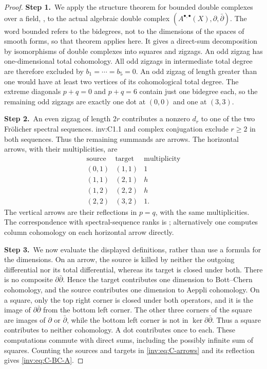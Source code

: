 \begin{proof}
\par\smallskip\noindent\textbf{Step 1.}\ We apply the structure theorem for bounded double complexes over a
field, \cite[Theorem 3]{Stelzig21}, to the actual algebraic double
complex $(A^{\bullet,\bullet}(X),\partial,\bar\partial)$.
The word bounded refers to the bidegrees, not to the dimensions of the
spaces of smooth forms, so that theorem applies here.  It gives a
direct-sum decomposition by isomorphisms of double complexes into
squares and zigzags.  An odd zigzag has one-dimensional total
cohomology.  All odd zigzags in intermediate total degree are therefore
excluded by $b_1=\cdots=b_5=0$.  An odd zigzag of length greater than
one would have at least two vertices of its cohomological total degree.
The extreme diagonals $p+q=0$ and $p+q=6$ contain just one bidegree
each, so the remaining odd zigzags are exactly one dot at $(0,0)$ and
one at $(3,3)$.

\par\smallskip\noindent\textbf{Step 2.}\ An even zigzag of length $2r$ contributes a nonzero $d_r$ to one of
the two Fr\"olicher spectral sequences.  inv:C1.1 and complex conjugation
exclude $r\ge2$ in both sequences.  Thus the remaining summands are
arrows.  The horizontal arrows, with their multiplicities, are
\begin{equation}\label{inv:eq:C-arrows}
\begin{array}{c|c|r}
\text{source}&\text{target}&\text{multiplicity}\\\hline
(0,1)&(1,1)&1\\
(1,1)&(2,1)&h\\
(1,2)&(2,2)&h\\
(2,2)&(3,2)&1.
\end{array}
\end{equation}
The vertical arrows are their reflections in $p=q$, with the same
multiplicities.  The correspondence with spectral-sequence ranks is
\cite[Proposition 6(1)]{Stelzig21}; alternatively one computes
column cohomology on each horizontal arrow directly.

\par\smallskip\noindent\textbf{Step 3.}\ We now evaluate the displayed definitions, rather than use a formula
for the dimensions.  On an arrow, the source is killed by neither
the outgoing differential nor its total differential, whereas its
target is closed under both.  There is no composite
$\partial\bar\partial$.  Hence the target contributes one dimension
to Bott--Chern cohomology, and the source contributes one dimension
to Aeppli cohomology.  On a square, only the top right corner is closed
under both operators, and it is the image of
$\partial\bar\partial$ from the bottom left corner.  The other
three corners of the square are images of $\partial$ or
$\bar\partial$, while the bottom left corner is not in
$\ker\partial\bar\partial$.  Thus a square contributes to neither
cohomology.  A dot contributes once to each.  These computations
commute with direct sums, including the possibly infinite sum of
squares.  Counting the sources and targets in \eqref{inv:eq:C-arrows}
and its reflection gives \eqref{inv:eq:C-BC-A}.


\end{proof}
